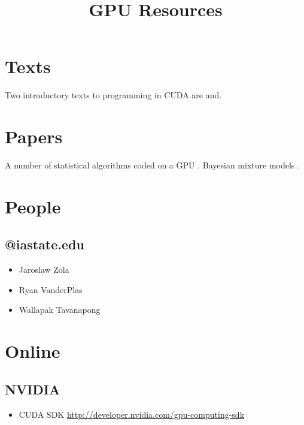 \documentclass{article}
\title{GPU Resources}
\begin{document}
\section{Texts}

Two introductory texts to programming in CUDA are \cite{sanders2010cuda} and\cite{kirk2010programming}.

\section{Papers}

A number of statistical algorithms coded on a GPU \citep{lee2010utility}. Bayesian mixture models \citep{suchard2010understanding}.

\section{People}

\subsection{@iastate.edu}

\begin{itemize}
\item Jaroslaw Zola
\item Ryan VanderPlas
\item Wallapak Tavanapong
\end{itemize}

\section{Online}

\subsection{NVIDIA}

\begin{itemize}
\item CUDA SDK \url{http://developer.nvidia.com/gpu-computing-sdk} 
\end{itemize}





\end{document}
